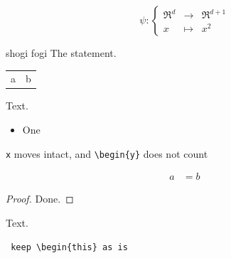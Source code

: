 \documentclass{article}
\begin{document}
\begin{equation*}
  \psi:\left\{
    \begin{array}{rcl}
      \Re^d& \rightarrow& \Re^{d+1}\\x &\mapsto& x^2
  \end{array}\right.
\end{equation*}

\begin{theorem}{shogi fogi}
  The statement.
\end{theorem}
\begin{tabular}{p{3cm}l}
  a & b \\
\end{tabular}
\begin{lemma} 
  Text.
\end{lemma}
\begin{itemize}
  \item One
\end{itemize}
\begin{center}
  \verb|x| moves intact, and \verb|\begin{y}| does not count
\end{center}
\begin{equation*}
  \begin{aligned}
    a &= b
  \end{aligned}
\end{equation*}

\begin{proof} %
  Done.
\end{proof}
\begin{theorem} Text.
\end{theorem}
\begin{verbatim} keep \begin{this} as is
\end{verbatim}
\end{document}
